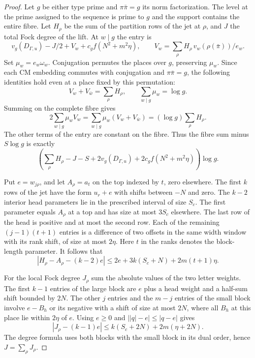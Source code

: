 \begin{proof}
Let \(g\) be either type prime and \(\pi\bar\pi=g\) its norm
factorization. The level at the prime assigned to the sequence is prime to \(g\) and the support
contains the entire fibre. Let \(H_\rho\) be the sum of the
partition rows of the jet at \(\rho\), and \(J\) the total Fock
degree of the lift. At \(w\mid g\) the entry is
\[
 v_g(D_{\Gamma,u})-J/2+
 V_w+c_g f(N^2+m^2\eta),\qquad
 V_w=\sum_\rho H_\rho\,v_w(\rho(\bar\pi))/e_w .
\]
Set \(\mu_w=e_w\omega_w\). Conjugation permutes the places over
\(g\), preserving \(\mu_w\). Since each CM embedding commutes with
conjugation and \(\pi\bar\pi=g\), the following identities hold even
at a place fixed by this permutation:
\[
 V_w+V_{\bar w}=\sum_\rho H_\rho,\qquad
 \sum_{w\mid g}\mu_w=\log g .
\]
Summing on the complete fibre gives
\[
 2\sum_{w\mid g}\mu_w V_w
   =\sum_{w\mid g}\mu_w(V_w+V_{\bar w})
   =(\log g)\sum_\rho H_\rho .
\]
The other terms of the entry are constant on the fibre. Thus
the fibre sum minus \(S\log g\) is exactly
\[
 \left(\sum_\rho H_\rho-J-S+2v_g(D_{\Gamma,u})
                  +2c_g f(N^2+m^2\eta)\right)\log g.
\]


Put \(e=w_{j\rho}\), and let \(A_\rho=a_t\) on the top indexed
by \(t\), zero elsewhere. The first \(k\) rows of the jet have the
form \(u_r+e\) with shifts between \(-N\) and zero. The \(k-2\)
interior head parameters lie in the prescribed interval of
size \(S_c\). The
first parameter equals \(A_\rho\) at a top and has size at most
\(3S_c\) elsewhere. The last row of the head is positive and
at most the second row. Each of the remaining
\((j-1)(t+1)\) entries is a difference of two offsets in the
same width window with its rank shift, of size at most \(2\eta\).
Here \(t\) in the ranks denotes the block-length parameter. It
follows that
\[
 |H_\rho-A_\rho-(k-2)e|
 \le 2e+3k(S_c+N)+2m(t+1)\eta .
\]

For the local Fock degree \(J_\rho\) sum the absolute values of the
two letter weights. The first \(k-1\) entries of the large block
are \(e\) plus a head weight and a half-sum shift bounded by
\(2N\). The other \(j\) entries and the \(m-j\) entries of the
small block involve \(e-B_h\) or its negative with a shift of size
at most \(2N\), where all \(B_h\) at this place lie within
\(2\eta\) of \(e\). Using \(e\ge0\) and
\(\big||q|-e\big|\le |q-e|\) gives
\[
 |J_\rho-(k-1)e|
 \le k(S_c+2N)+2m(\eta+2N).
\]
The degree formula uses both blocks with the small block in its
dual order, hence \(J=\sum_\rho J_\rho\).


\end{proof}
